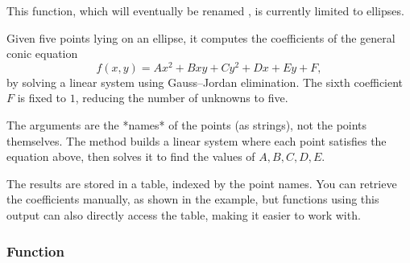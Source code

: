 This function, which will eventually be renamed , is currently limited to ellipses.

Given five points lying on an ellipse, it computes the coefficients of the general conic equation
\[
f(x, y) = Ax^2 + Bxy + Cy^2 + Dx + Ey + F,
\]
by solving a linear system using Gauss–Jordan elimination.
The sixth coefficient \( F \) is fixed to \( 1 \), reducing the number of unknowns to five.

The arguments are the *names* of the points (as strings), not the points themselves. The method builds a linear system where each point satisfies the equation above, then solves it to find the values of \( A, B, C, D, E \).

The results are stored in a table, indexed by the point names. You can retrieve the coefficients manually, as shown in the example, but functions using this output can also directly access the table, making it easier to work with.

\vspace{1em}

\begin{tkzexample}[latex=.35\textwidth]
\end{tkzexample}


\subsubsection{Function } %
\label{ssub:function_ellipse_axes_angle}

